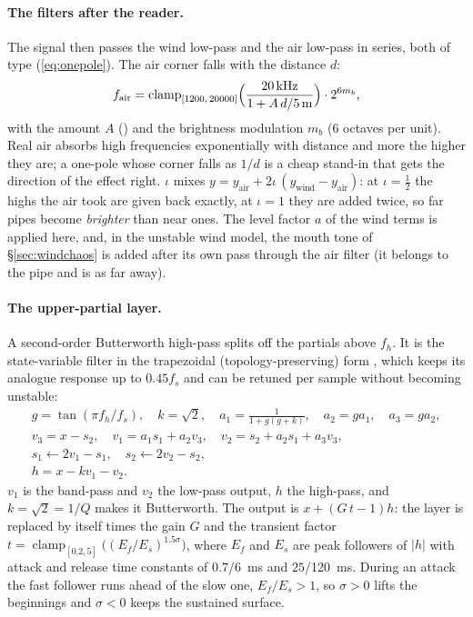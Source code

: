 \paragraph{The filters after the reader.} The signal then passes the wind low-pass and the air low-pass in series,
both of type (\ref{eq:onepole}). The air corner falls with the distance $d$:
\begin{equation}
  f_\mathrm{air} = \operatorname{clamp}_{[1200,\,20000]}\Bigl(\frac{\SI{20}{kHz}}{1 + A\,d/\SI{5}{m}}\Bigr)\cdot 2^{6m_b},
\end{equation}
with the amount $A$ () and the brightness modulation $m_b$ (6 octaves per unit). Real air absorbs high
frequencies exponentially with distance and more the higher they are; a one-pole whose corner falls as $1/d$ is a
cheap stand-in that gets the direction of the effect right.  $\iota$ mixes
$y = y_\mathrm{air} + 2\iota\,(y_\mathrm{wind} - y_\mathrm{air})$: at $\iota = \tfrac12$ the highs the air took are
given back exactly, at $\iota = 1$ they are added twice, so far pipes become \emph{brighter} than near ones. The level
factor $a$ of the wind terms is applied here, and, in the unstable wind model, the mouth tone of
\S\ref{sec:windchaos} is added after its own pass through the air filter (it belongs to the pipe and is as far
away).

\paragraph{The upper-partial layer.} A second-order Butterworth high-pass splits off the partials above $f_h$. It is
the state-variable filter in the trapezoidal (topology-preserving) form \citep{zavalishin2012}, which keeps its
analogue response up to $0.45f_s$ and can be retuned per sample without becoming unstable:
\begin{gather}
  g = \tan(\pi f_h/f_s),\quad k = \sqrt2,\quad a_1 = \frac{1}{1+g(g+k)},\quad a_2 = g a_1,\quad a_3 = g a_2,\\
  v_3 = x - s_2,\quad v_1 = a_1 s_1 + a_2 v_3,\quad v_2 = s_2 + a_2 s_1 + a_3 v_3,\\
  s_1 \leftarrow 2v_1 - s_1,\quad s_2 \leftarrow 2v_2 - s_2,\\
  h = x - k v_1 - v_2 .
\end{gather}
$v_1$ is the band-pass and $v_2$ the low-pass output, $h$ the high-pass, and $k=\sqrt2 = 1/Q$ makes it Butterworth.
The output is $x + (G\,t - 1)h$: the layer is replaced by itself times the gain $G$ and the transient factor
$t = \operatorname{clamp}_{[0.2,5]}\bigl((E_f/E_s)^{1.5\sigma}\bigr)$, where $E_f$ and $E_s$ are peak followers of
$|h|$ with attack and release time constants of $0.7$/\SI{6}{ms} and $25$/\SI{120}{ms}. During an attack the fast
follower runs ahead of the slow one, $E_f/E_s>1$, so $\sigma>0$ lifts the beginnings and $\sigma<0$ keeps the
sustained surface.

